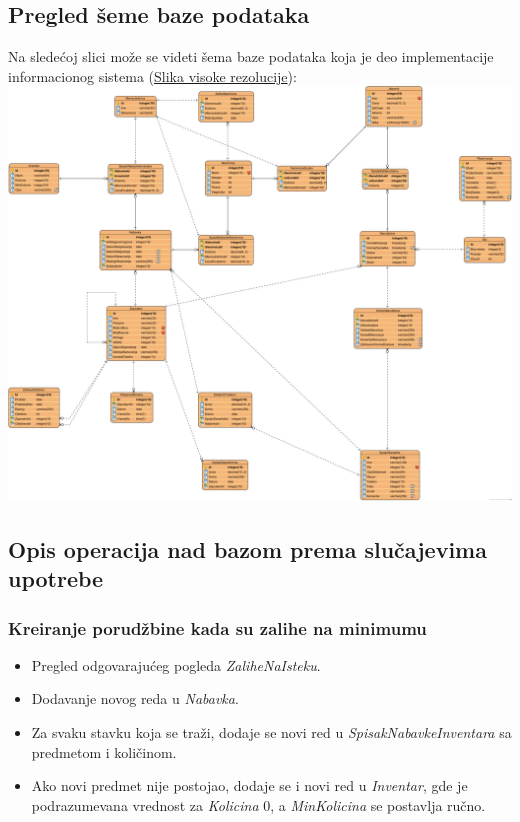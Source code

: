 \documentclass{article}
\begin{document}
\subsection{Pregled šeme baze podataka}
Na sledećoj slici može se videti šema baze podataka koja je deo implementacije informacionog sistema (\href{https://raw.githubusercontent.com/bozidarrr/NajmanjiProblem/master/FinalniDokument/NajmanjiProblem_BazaPodataka.png}{Slika visoke rezolucije}):\\
\vspace{1mm}
 \includegraphics[width=\textwidth]{NajmanjiProblem_BazaPodataka.png}
 
\subsection{Opis operacija nad bazom prema slučajevima upotrebe}
\subsubsection{Kreiranje porudžbine kada su zalihe na minimumu}
\begin{itemize}
\item Pregled odgovarajućeg pogleda \emph{ZaliheNaIsteku}.
\item Dodavanje novog reda u \emph{Nabavka}.
\item Za svaku stavku koja se traži, dodaje se novi red u \emph{SpisakNabavkeInventara} sa predmetom i količinom.
\item Ako novi predmet nije postojao, dodaje se i novi red u \emph{Inventar}, gde je podrazumevana vrednost za \emph{Kolicina} 0, a \emph{MinKolicina} se postavlja ručno.
\end{itemize}
\end{document}
